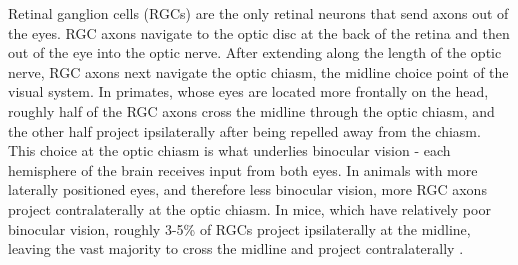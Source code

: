 Retinal ganglion cells (RGCs) are the only retinal neurons that send axons out of the eyes.
RGC axons navigate to the optic disc at the back of the retina and then out of the eye into the optic nerve.
After extending along the length of the optic nerve, RGC axons next navigate the optic chiasm, the midline choice point of the visual system.
In primates, whose eyes are located more frontally on the head, roughly half of the RGC axons cross the midline through the optic chiasm, and the other half project ipsilaterally after being repelled away from the chiasm.
This choice at the optic chiasm is what underlies binocular vision - each hemisphere of the brain receives input from both eyes.
In animals with more laterally positioned eyes, and therefore less binocular vision, more RGC axons project contralaterally at the optic chiasm.
In mice, which have relatively poor binocular vision, roughly 3-5\% of RGCs project ipsilaterally at the midline, leaving the vast majority to cross the midline and project contralaterally \cite{petros2008retinal}.

